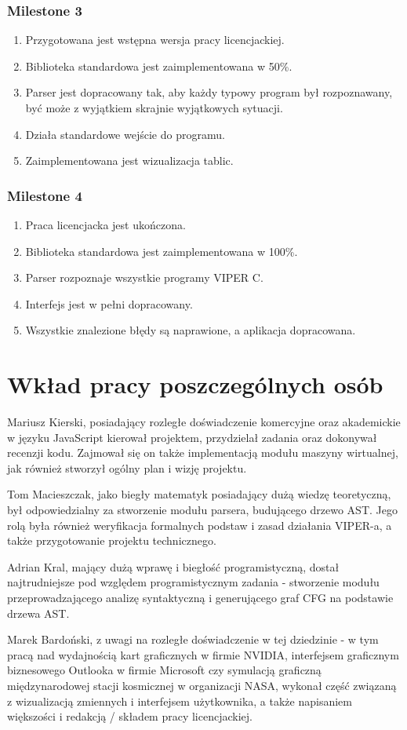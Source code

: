 \documentclass[a4paper,twoside,openright,11pt]{report}
\begin{document}
  \subsection {Milestone 3}
  \begin {enumerate}
    \item Przygotowana jest wstępna wersja pracy licencjackiej.
    \item Biblioteka standardowa jest zaimplementowana w 50\%. 
    \item Parser jest dopracowany tak, aby każdy typowy program był rozpoznawany, być może z wyjątkiem skrajnie wyjątkowych sytuacji.
    \item Działa standardowe wejście do programu.
    \item Zaimplementowana jest wizualizacja tablic.
  \end {enumerate}
  \subsection {Milestone 4}
  \begin {enumerate}
    \item Praca licencjacka jest ukończona.
    \item Biblioteka standardowa jest zaimplementowana w 100\%.
    \item Parser rozpoznaje wszystkie programy VIPER C.
    \item Interfejs jest w pełni dopracowany.
    \item Wszystkie znalezione błędy są naprawione, a aplikacja dopracowana.
  \end {enumerate}

  \chapter {Wkład pracy poszczególnych osób}
\par Mariusz Kierski, posiadający rozległe doświadczenie komercyjne oraz akademickie w języku JavaScript kierował projektem, przydzielał zadania oraz dokonywał recenzji kodu. Zajmował się on także implementacją modułu maszyny wirtualnej, jak również stworzył ogólny plan i wizję projektu.
\par Tom Macieszczak, jako biegły matematyk posiadający dużą wiedzę teoretyczną, był odpowiedzialny za stworzenie modułu parsera, budującego drzewo AST. Jego rolą była również weryfikacja formalnych podstaw i zasad działania VIPER-a, a także przygotowanie projektu technicznego.
\par Adrian Kral, mający dużą wprawę i biegłość programistyczną, dostał najtrudniejsze pod względem programistycznym zadania - stworzenie modułu przeprowadzającego analizę syntaktyczną i generującego graf CFG na podstawie drzewa AST.  
\par Marek Bardoński, z uwagi na rozległe doświadczenie w tej dziedzinie - w tym pracą nad wydajnością kart graficznych w firmie NVIDIA, interfejsem graficznym biznesowego Outlooka w firmie Microsoft czy symulacją graficzną międzynarodowej stacji kosmicznej w organizacji NASA, wykonał część związaną z wizualizacją zmiennych i interfejsem użytkownika, a także napisaniem większości i redakcją / składem pracy licencjackiej.
\end{document}
